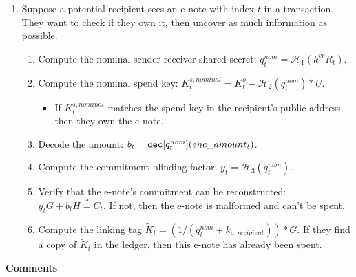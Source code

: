 \begin{enumerate}
    \item Suppose a potential recipient sees an e-note with index $t$ in a transaction. They want to check if they own it, then uncover as much information as possible.
    \begin{enumerate}
        \item Compute the nominal sender-receiver shared secret: $q^{nom}_t = \mathcal{H}_1(k^{vr} R_t)$.
        \item Compute the nominal spend key: $K^{s,nominal}_t = K^o_t - \mathcal{H}_2(q^{nom}_t)*U$.
        \begin{itemize}
            \item If $K^{s,nominal}_t$ matches the spend key in the recipient's public address, then they own the e-note.
        \end{itemize}
        \item Decode the amount: $b_t = \textrm{\tt dec}[q^{nom}_t](enc\_amount_t)$.
        \item Compute the commitment blinding factor: $y_t = \mathcal{H}_3(q^{nom}_t)$.
        \item Verify that the e-note's commitment can be reconstructed: $y_t G + b_t H \stackrel{?}{=} C_t$. If not, then the e-note is malformed and can't be spent.
        \item Compute the linking tag $\tilde{K}_t = (1/(q^{nom}_t + k_{a,recipient}))*G$. If they find a copy of $\tilde{K}_t$ in the ledger, then this e-note has already been spent.
    \end{enumerate}
\end{enumerate}

\textbf{Comments}

